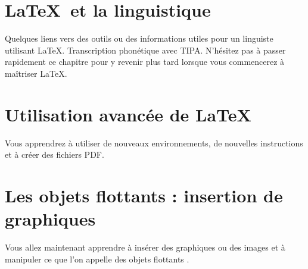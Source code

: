 



\chapter{\LaTeX\ et la linguistique}
\label{cha:babel}
\begin{center}
  \begin{minipage}[r]{0.5\linewidth}
    Quelques liens vers des outils ou des informations utiles pour un
    linguiste utilisant \LaTeX. Transcription phonétique avec
    TIPA. N'hésitez pas à passer rapidement ce chapitre pour y revenir
    plus tard lorsque vous commencerez à maîtriser \LaTeX.
  \end{minipage}
\end{center}





\chapter{Utilisation avancée de \LaTeX}
\begin{center}
  \begin{minipage}[r]{0.5\linewidth}
    Vous apprendrez à utiliser de nouveaux environnements, de
    nouvelles instructions et à créer des fichiers PDF.
  \end{minipage}
\end{center}




    

% 


\chapter{Les objets flottants : insertion de graphiques}
\label{cha:graphiques}
\begin{center}
  \begin{minipage}[r]{0.5\linewidth}
    Vous allez maintenant apprendre à insérer des graphiques ou des
    images et à manipuler ce que l'on appelle des \og objets flottants
    \fg.
  \end{minipage}
\end{center}

